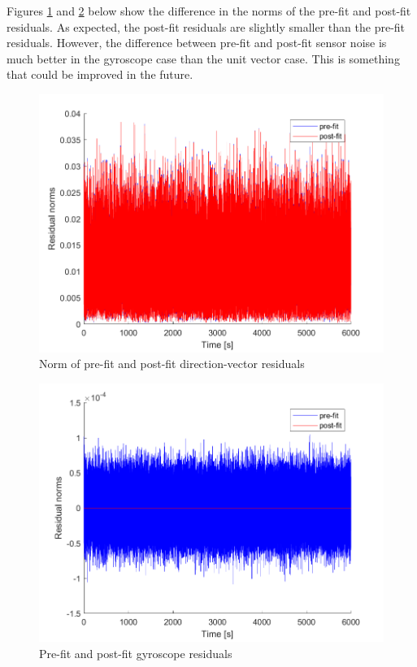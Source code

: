 Figures \ref{fig:ps8_problem7_res_units} and \ref{fig:ps8_problem7_res_gyro} below show the difference in the norms of the pre-fit and post-fit residuals. As expected, the post-fit residuals are slightly smaller than the pre-fit residuals. However, the difference between pre-fit and post-fit sensor noise is much better in the gyroscope case than the unit vector case. This is something that could be improved in the future.

\begin{figure}[H]
\centering
\includegraphics[scale=0.7]{Images/ps8_problem7_res_units.png}
\caption{Norm of pre-fit and post-fit direction-vector residuals}
\label{fig:ps8_problem7_res_units}
\end{figure}

\begin{figure}[H]
\centering
\includegraphics[scale=0.7]{Images/ps8_problem7_res_gyro.png}
\caption{Pre-fit and post-fit gyroscope residuals}
\label{fig:ps8_problem7_res_gyro}
\end{figure}


